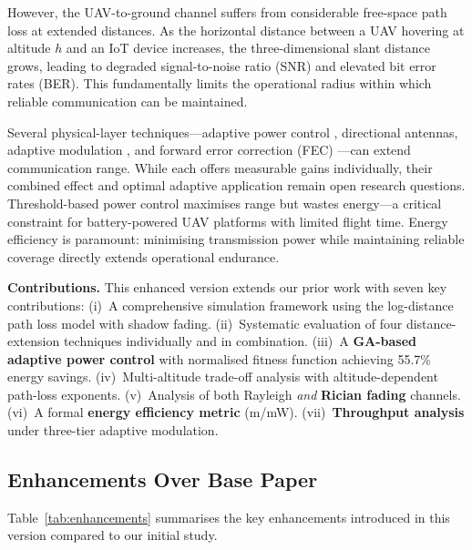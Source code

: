 \documentclass[conference]{IEEEtran}
\begin{document}
However, the UAV-to-ground channel suffers from considerable free-space path loss at extended distances. As the horizontal distance between a UAV hovering at altitude $h$ and an IoT device increases, the three-dimensional slant distance grows, leading to degraded signal-to-noise ratio (SNR) and elevated bit error rates (BER). This fundamentally limits the operational radius within which reliable communication can be maintained.

Several physical-layer techniques---adaptive power control \cite{b7}, directional antennas, adaptive modulation \cite{b5}, and forward error correction (FEC) \cite{b8}---can extend communication range. While each offers measurable gains individually, their combined effect and optimal adaptive application remain open research questions. Threshold-based power control maximises range but wastes energy---a critical constraint for battery-powered UAV platforms with limited flight time. Energy efficiency is paramount: minimising transmission power while maintaining reliable coverage directly extends operational endurance.

\textbf{Contributions.} This enhanced version extends our prior work \cite{b0} with seven key contributions: (i)~A comprehensive simulation framework using the log-distance path loss model with shadow fading. (ii)~Systematic evaluation of four distance-extension techniques individually and in combination. (iii)~A \textbf{GA-based adaptive power control} with normalised fitness function achieving 55.7\% energy savings. (iv)~Multi-altitude trade-off analysis with altitude-dependent path-loss exponents. (v)~Analysis of both Rayleigh \textit{and} \textbf{Rician fading} channels. (vi)~A formal \textbf{energy efficiency metric} (m/mW). (vii)~\textbf{Throughput analysis} under three-tier adaptive modulation.

\subsection{Enhancements Over Base Paper}
Table~\ref{tab:enhancements} summarises the key enhancements introduced in this version compared to our initial study.
\end{document}
